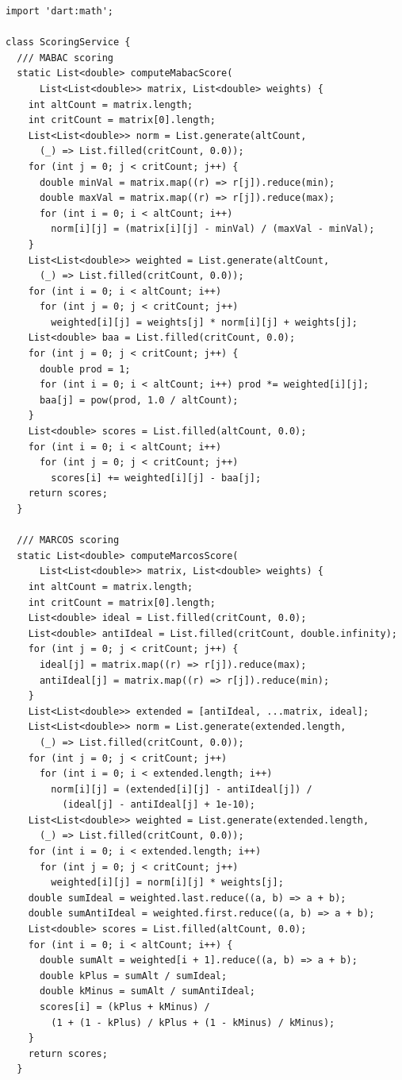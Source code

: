 \documentclass[12pt,a4paper,oneside]{report}
\begin{document}
\begin{lstlisting}[style=dartstyle]
import 'dart:math';

class ScoringService {
  /// MABAC scoring
  static List<double> computeMabacScore(
      List<List<double>> matrix, List<double> weights) {
    int altCount = matrix.length;
    int critCount = matrix[0].length;
    List<List<double>> norm = List.generate(altCount,
      (_) => List.filled(critCount, 0.0));
    for (int j = 0; j < critCount; j++) {
      double minVal = matrix.map((r) => r[j]).reduce(min);
      double maxVal = matrix.map((r) => r[j]).reduce(max);
      for (int i = 0; i < altCount; i++)
        norm[i][j] = (matrix[i][j] - minVal) / (maxVal - minVal);
    }
    List<List<double>> weighted = List.generate(altCount,
      (_) => List.filled(critCount, 0.0));
    for (int i = 0; i < altCount; i++)
      for (int j = 0; j < critCount; j++)
        weighted[i][j] = weights[j] * norm[i][j] + weights[j];
    List<double> baa = List.filled(critCount, 0.0);
    for (int j = 0; j < critCount; j++) {
      double prod = 1;
      for (int i = 0; i < altCount; i++) prod *= weighted[i][j];
      baa[j] = pow(prod, 1.0 / altCount);
    }
    List<double> scores = List.filled(altCount, 0.0);
    for (int i = 0; i < altCount; i++)
      for (int j = 0; j < critCount; j++)
        scores[i] += weighted[i][j] - baa[j];
    return scores;
  }

  /// MARCOS scoring
  static List<double> computeMarcosScore(
      List<List<double>> matrix, List<double> weights) {
    int altCount = matrix.length;
    int critCount = matrix[0].length;
    List<double> ideal = List.filled(critCount, 0.0);
    List<double> antiIdeal = List.filled(critCount, double.infinity);
    for (int j = 0; j < critCount; j++) {
      ideal[j] = matrix.map((r) => r[j]).reduce(max);
      antiIdeal[j] = matrix.map((r) => r[j]).reduce(min);
    }
    List<List<double>> extended = [antiIdeal, ...matrix, ideal];
    List<List<double>> norm = List.generate(extended.length,
      (_) => List.filled(critCount, 0.0));
    for (int j = 0; j < critCount; j++)
      for (int i = 0; i < extended.length; i++)
        norm[i][j] = (extended[i][j] - antiIdeal[j]) /
          (ideal[j] - antiIdeal[j] + 1e-10);
    List<List<double>> weighted = List.generate(extended.length,
      (_) => List.filled(critCount, 0.0));
    for (int i = 0; i < extended.length; i++)
      for (int j = 0; j < critCount; j++)
        weighted[i][j] = norm[i][j] * weights[j];
    double sumIdeal = weighted.last.reduce((a, b) => a + b);
    double sumAntiIdeal = weighted.first.reduce((a, b) => a + b);
    List<double> scores = List.filled(altCount, 0.0);
    for (int i = 0; i < altCount; i++) {
      double sumAlt = weighted[i + 1].reduce((a, b) => a + b);
      double kPlus = sumAlt / sumIdeal;
      double kMinus = sumAlt / sumAntiIdeal;
      scores[i] = (kPlus + kMinus) /
        (1 + (1 - kPlus) / kPlus + (1 - kMinus) / kMinus);
    }
    return scores;
  }


\end{lstlisting}
\end{document}
